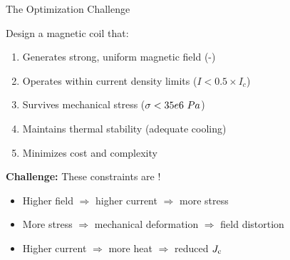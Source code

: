 \begin{frame}{The Optimization Challenge}
    \begin{block}{Design a magnetic coil that:}
        \begin{enumerate}
            \item Generates strong, uniform magnetic field (-)
            \item Operates within current density limits ($I < 0.5 \times I_c$)
            \item Survives mechanical stress ($\sigma < 35e6~Pa$)
            \item Maintains thermal stability (adequate cooling)
            \item Minimizes cost and complexity
        \end{enumerate}
    \end{block}
    
    \vspace{0.5cm}
    \textbf{Challenge:} These constraints are !
    \begin{itemize}
        \item Higher field $\Rightarrow$ higher current $\Rightarrow$ more stress
        \item More stress $\Rightarrow$ mechanical deformation $\Rightarrow$ field distortion
        \item Higher current $\Rightarrow$ more heat $\Rightarrow$ reduced $J_\text{c}$
    \end{itemize}
\end{frame}

